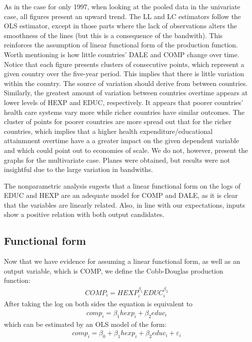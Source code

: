 \documentclass[12pt,a4paper]{article}\usepackage[]{graphicx}\usepackage[]{color}
\begin{document}
As in the case for only 1997, when looking at the pooled data in the univariate case, all figures present an upward trend. The LL and LC estimators follow the OLS estimator, except in those parts where the lack of observations alters the smoothness of the lines (but this is a consequence of the bandwith). This reinforces the assumption of linear functional form of the production function. Worth mentioning is how little countries' DALE and COMP change over time. Notice that each figure presents clusters of consecutive points, which represent a given country over the five-year period. This implies that there is little variation within the country. The source of variation should derive from between countries. Similarly, the greatest amount of variation between countries overtime appears at lower levels of HEXP and EDUC, respectively. It appears that poorer countries' health care systems vary more while richer countries have similar outcomes. The cluster of points for poorer countries are more spread out that for the richer countries, which implies that a higher health expenditure/educational attainmnent overtime have a a greater impact on the given dependent variable and which could point out to economies of scale. We do not, however, present the graphs for the multivariate case. Planes were obtained, but results were not insightful due to the large variation in bandwiths.

The nonparametric analysis sugests that a linear functional form on the logs of EDUC and HEXP are an adequate model for COMP and DALE, as it is clear that the variables are linearly related. Also, in line with our expectations, inputs show a positive relation with both output candidates.





\subsection{Functional form}
Now that we have evidence for assuming a linear functional form, as well as an output variable, which is COMP, we define the Cobb-Douglas production function:
\begin{gather}
COMP_i = HEXP_i^{\beta_1}EDUC_i^{\beta_2}
\end{gather}
After taking the log on both sides the equation is equivalent to
\begin{gather}
comp_i = \beta_1 hexp_i + \beta_2 educ_i
\end{gather}
which can be estimated by an OLS model of the form:
\begin{gather}
comp_i = \beta_0 + \beta_1 hexp_i + \beta_2 educ_i + \varepsilon_i
\end{gather}
\end{document}
